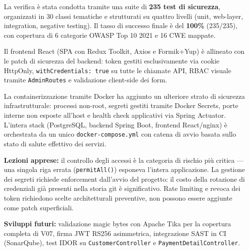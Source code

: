 \documentclass[12pt, a4paper]{article}
\begin{document}
    La verifica è stata condotta tramite una suite di \textbf{235 test di sicurezza},
    organizzati in 30 classi tematiche e strutturati su quattro livelli (unit,
    web-layer, integration, negative testing). Il tasso di successo finale è del
    \textbf{100\%} (235/235), con copertura di 6 categorie OWASP Top 10 2021 e
    16 CWE mappate.

    Il frontend React (SPA con Redux Toolkit, Axios e Formik+Yup) è allineato con le
    patch di sicurezza del backend: token gestiti esclusivamente via cookie HttpOnly,
    \texttt{withCredentials: true} su tutte le chiamate API, RBAC visuale tramite
    \texttt{AdminRoutes} e validazione client-side dei form.

    La containerizzazione tramite Docker ha aggiunto un ulteriore strato di sicurezza
    infrastrutturale: processi non-root, segreti gestiti tramite Docker Secrets,
    porte interne non esposte all'host e health check applicativi via Spring Actuator.
    L'intera stack (PostgreSQL, backend Spring Boot, frontend React/nginx) è
    orchestrata da un unico \texttt{docker-compose.yml} con catena di avvio basata
    sullo stato di salute effettivo dei servizi.

    \textbf{Lezioni apprese:} il controllo degli accessi è la categoria di rischio
    più critica --- una singola riga errata (\texttt{permitAll()}) esponeva l'intera
    applicazione. La gestione dei segreti richiede enforcement dall'avvio del progetto:
    il costo della rotazione di credenziali già presenti nella storia git è significativo.
    Rate limiting e revoca dei token richiedono scelte architetturali preventive, non
    possono essere aggiunte come patch superficiali.

    \textbf{Sviluppi futuri:} validazione magic bytes con Apache Tika per la copertura
    completa di V07, firma JWT RS256 asimmetrica, integrazione SAST in CI (SonarQube),
    test IDOR su \texttt{CustomerController} e \texttt{PaymentDetailController}.
\end{document}
